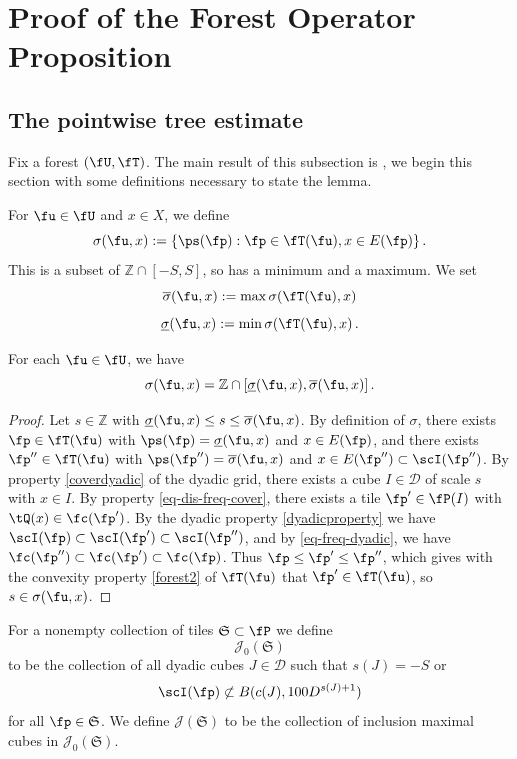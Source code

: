 \section{Proof of the Forest Operator Proposition}

\label{treesection}

\subsection{The pointwise tree estimate}
Fix a forest $(\fU, \fT)$. The main result of this subsection is , we begin this section with some definitions necessary to state the lemma.

For $\fu \in \fU$ and $x\in X$, we define
$$
    \sigma (\fu, x):=\{\ps(\fp):\fp\in \fT(\fu), x\in E(\fp)\}\,.
$$
This is a subset of $\mathbb{Z} \cap [-S, S]$, so has a minimum and a maximum. We set
$$
    \overline{\sigma} (\fu, x) := \max \sigma(\fT(\fu), x)
$$
$$
    \underline{\sigma} (\fu, x) := \min\sigma(\fT(\fu), x)\,.
$$
\begin{lemma}
\label{convex-scales}
\leanok
{}
    For each $\fu \in \fU$, we have
    $$
        \sigma(\fu, x) = \mathbb{Z} \cap [\underline{\sigma} (\fu, x), \overline{\sigma} (\fu, x)]\,.
    $$
\end{lemma}

\begin{proof}
    \leanok
    Let $s \in \mathbb{Z}$ with $\underline{\sigma} (\fu, x) \le s \le \overline{\sigma} (\fu, x)$. By definition of $\sigma$, there exists $\fp \in \fT(\fu)$ with $\ps(\fp) = \underline{\sigma} (\fu, x)$ and $x \in E(\fp)$, and there exists $\fp'' \in \fT(\fu)$ with $\ps(\fp'') = \overline{\sigma} (\fu, x)$ and $x \in E(\fp'') \subset \scI(\fp'')$. By property \eqref{coverdyadic} of the dyadic grid, there exists a cube $I \in \mathcal{D}$ of scale $s$ with $x \in I$. By property \eqref{eq-dis-freq-cover}, there exists a tile $\fp' \in \fP(I)$ with $\tQ(x) \in \fc(\fp')$. By the dyadic property \eqref{dyadicproperty} we have $\scI(\fp) \subset \scI(\fp') \subset \scI(\fp'')$, and by \eqref{eq-freq-dyadic}, we have $\fc(\fp'') \subset \fc(\fp') \subset \fc(\fp)$. Thus $\fp \le \fp' \le\fp''$, which gives with the convexity property \eqref{forest2} of $\fT(\fu)$ that $\fp' \in \fT(\fu)$, so $s \in \sigma(\fu, x)$.
\end{proof}

For a nonempty collection of tiles $\mathfrak{S} \subset \fP$ we define
$$
    \mathcal{J}_0(\mathfrak{S})
$$
to be the collection of all dyadic cubes $J \in \mathcal{D}$ such that $s(J) = -S$ or
$$
    \scI(\fp) \not\subset B(c(J), 100D^{s(J) + 1})
$$
for all $\fp \in \mathfrak{S}$. We define $\mathcal{J}(\mathfrak{S})$ to be the collection of inclusion maximal cubes in $\mathcal{J}_0(\mathfrak{S})$.

